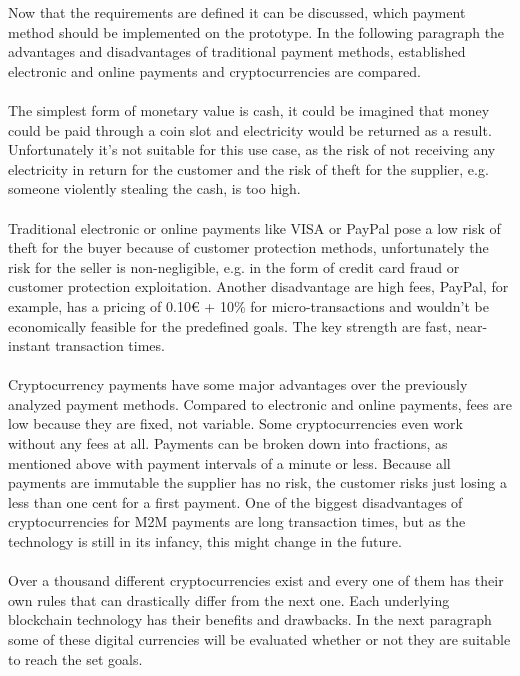 Now that the requirements are defined it can be discussed, which payment method should be implemented on the prototype. In the following paragraph the advantages and disadvantages of traditional payment methods, established electronic and online payments and cryptocurrencies are compared.
\\\\
The simplest form of monetary value is cash, it could be imagined that money could be paid through a coin slot and electricity would be returned as a result. Unfortunately it's not suitable for this use case, as the risk of not receiving any electricity in return for the customer and the risk of theft for the supplier, e.g. someone violently stealing the cash, is too high.
\\\\
Traditional electronic or online payments like VISA or PayPal pose a low risk of theft for the buyer because of customer protection methods, unfortunately the risk for the seller is non-negligible, e.g. in the form of credit card fraud or customer protection exploitation. Another disadvantage are high fees, PayPal, for example, has a pricing of 0.10\euro{} + 10\% for micro-transactions\cite{paypal-fees} and wouldn't be economically feasible for the predefined goals. The key strength are fast, near-instant transaction times.
\\\\
Cryptocurrency payments have some major advantages over the previously analyzed payment methods. Compared to electronic and online payments, fees are low because they are fixed, not variable. Some cryptocurrencies even work without any fees at all. Payments can be broken down into fractions, as mentioned above with payment intervals of a minute or less. Because all payments are immutable the supplier has no risk, the customer risks just losing a less than one cent for a first payment. One of the biggest disadvantages of cryptocurrencies for M2M payments are long transaction times, but as the technology is still in its infancy, this might change in the future.
\\\\
Over a thousand different cryptocurrencies exist and every one of them has their own rules that can drastically differ from the next one. Each underlying blockchain technology has their benefits and drawbacks. In the next paragraph some of these digital currencies will be evaluated whether or not they are suitable to reach the set goals.
\\\\
